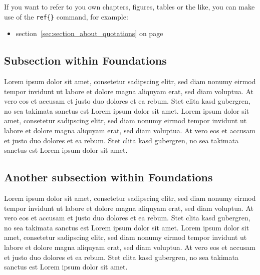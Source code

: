 \documentclass[a4paper]{article}
\begin{document}
If you want to refer to you own chapters, figures, tables or the like, you can make use of the \texttt{ref\{\}} command, for example:
\begin{itemize}
	\item section~\ref{sec:section_about_quotations} on page \pageref{sec:section_about_quotations}
\end{itemize} 




\subsection{Subsection within Foundations} %
\label{sub:subsection_within_foundations}
Lorem ipsum dolor sit amet, consetetur sadipscing elitr, sed diam nonumy eirmod tempor invidunt ut labore et dolore magna aliquyam erat, sed diam voluptua. At vero eos et accusam et justo duo dolores et ea rebum. Stet clita kasd gubergren, no sea takimata sanctus est Lorem ipsum dolor sit amet. Lorem ipsum dolor sit amet, consetetur sadipscing elitr, sed diam nonumy eirmod tempor invidunt ut labore et dolore magna aliquyam erat, sed diam voluptua. At vero eos et accusam et justo duo dolores et ea rebum. Stet clita kasd gubergren, no sea takimata sanctus est Lorem ipsum dolor sit amet.

\subsection{Another subsection within Foundations} %
\label{sub:another_subsection_within_foundations}
Lorem ipsum dolor sit amet, consetetur sadipscing elitr, sed diam nonumy eirmod tempor invidunt ut labore et dolore magna aliquyam erat, sed diam voluptua. At vero eos et accusam et justo duo dolores et ea rebum. Stet clita kasd gubergren, no sea takimata sanctus est Lorem ipsum dolor sit amet. Lorem ipsum dolor sit amet, consetetur sadipscing elitr, sed diam nonumy eirmod tempor invidunt ut labore et dolore magna aliquyam erat, sed diam voluptua. At vero eos et accusam et justo duo dolores et ea rebum. Stet clita kasd gubergren, no sea takimata sanctus est Lorem ipsum dolor sit amet.


\end{document}
